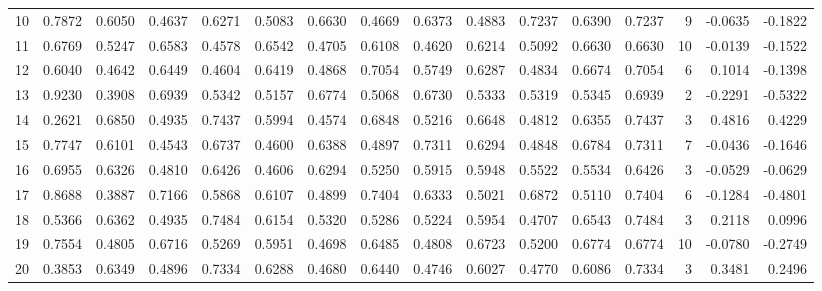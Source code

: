 \begin{tabular}{lrrrrrrrrrrrrrrr}
10  &      0.7872 &  0.6050 &  0.4637 &  0.6271 &  0.5083 &  0.6630 &  0.4669 &  0.6373 &  0.4883 &  0.7237 &   0.6390 &     0.7237 &      9 &                   -0.0635 &                    -0.1822 \\
11  &      0.6769 &  0.5247 &  0.6583 &  0.4578 &  0.6542 &  0.4705 &  0.6108 &  0.4620 &  0.6214 &  0.5092 &   0.6630 &     0.6630 &     10 &                   -0.0139 &                    -0.1522 \\
12  &      0.6040 &  0.4642 &  0.6449 &  0.4604 &  0.6419 &  0.4868 &  0.7054 &  0.5749 &  0.6287 &  0.4834 &   0.6674 &     0.7054 &      6 &                    0.1014 &                    -0.1398 \\
13  &      0.9230 &  0.3908 &  0.6939 &  0.5342 &  0.5157 &  0.6774 &  0.5068 &  0.6730 &  0.5333 &  0.5319 &   0.5345 &     0.6939 &      2 &                   -0.2291 &                    -0.5322 \\
14  &      0.2621 &  0.6850 &  0.4935 &  0.7437 &  0.5994 &  0.4574 &  0.6848 &  0.5216 &  0.6648 &  0.4812 &   0.6355 &     0.7437 &      3 &                    0.4816 &                     0.4229 \\
15  &      0.7747 &  0.6101 &  0.4543 &  0.6737 &  0.4600 &  0.6388 &  0.4897 &  0.7311 &  0.6294 &  0.4848 &   0.6784 &     0.7311 &      7 &                   -0.0436 &                    -0.1646 \\
16  &      0.6955 &  0.6326 &  0.4810 &  0.6426 &  0.4606 &  0.6294 &  0.5250 &  0.5915 &  0.5948 &  0.5522 &   0.5534 &     0.6426 &      3 &                   -0.0529 &                    -0.0629 \\
17  &      0.8688 &  0.3887 &  0.7166 &  0.5868 &  0.6107 &  0.4899 &  0.7404 &  0.6333 &  0.5021 &  0.6872 &   0.5110 &     0.7404 &      6 &                   -0.1284 &                    -0.4801 \\
18  &      0.5366 &  0.6362 &  0.4935 &  0.7484 &  0.6154 &  0.5320 &  0.5286 &  0.5224 &  0.5954 &  0.4707 &   0.6543 &     0.7484 &      3 &                    0.2118 &                     0.0996 \\
19  &      0.7554 &  0.4805 &  0.6716 &  0.5269 &  0.5951 &  0.4698 &  0.6485 &  0.4808 &  0.6723 &  0.5200 &   0.6774 &     0.6774 &     10 &                   -0.0780 &                    -0.2749 \\
20  &      0.3853 &  0.6349 &  0.4896 &  0.7334 &  0.6288 &  0.4680 &  0.6440 &  0.4746 &  0.6027 &  0.4770 &   0.6086 &     0.7334 &      3 &                    0.3481 &                     0.2496 \\

\end{tabular}
